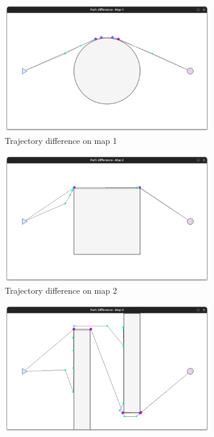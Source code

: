 \documentclass[../main.tex]{subfiles}
\begin{document}
\begin{figure}[H]
	\centering
	\begin{subfigure}[b]{0.45\textwidth}
		\centering
		\includegraphics[width=\textwidth]{IMAGES/part3/traj_diff_map1.png}
		\caption{Trajectory difference on map 1}
		\label{fig:traj_diff_map1}
	\end{subfigure}
	\hfill
	\begin{subfigure}[b]{0.45\textwidth}
		\centering
		\includegraphics[width=\textwidth]{IMAGES/part3/traj_diff_map2.png}
		\caption{Trajectory difference on map 2}
		\label{fig:traj_diff_map2}
	\end{subfigure}
	\vfill
	\begin{subfigure}[b]{0.45\textwidth}
		\centering
		\includegraphics[width=\textwidth]{IMAGES/part3/traj_diff_map5.png}

\end{subfigure}
\end{figure}
\end{document}
